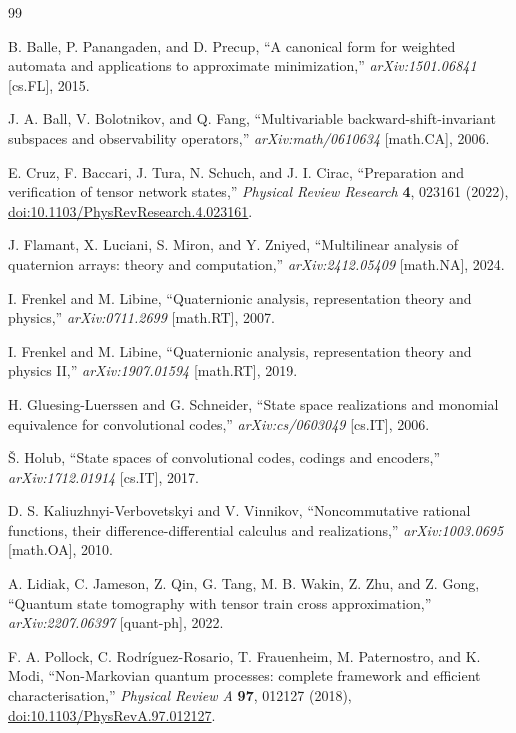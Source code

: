 \begin{thebibliography}{99}

B. Balle, P. Panangaden, and D. Precup,
``A canonical form for weighted automata and applications to approximate minimization,''
\emph{arXiv:1501.06841} [cs.FL], 2015.

J. A. Ball, V. Bolotnikov, and Q. Fang,
``Multivariable backward-shift-invariant subspaces and observability operators,''
\emph{arXiv:math/0610634} [math.CA], 2006.

E. Cruz, F. Baccari, J. Tura, N. Schuch, and J. I. Cirac,
``Preparation and verification of tensor network states,''
\emph{Physical Review Research} \textbf{4}, 023161 (2022),
\href{https://doi.org/10.1103/PhysRevResearch.4.023161}{doi:10.1103/PhysRevResearch.4.023161}.

J. Flamant, X. Luciani, S. Miron, and Y. Zniyed,
``Multilinear analysis of quaternion arrays: theory and computation,''
\emph{arXiv:2412.05409} [math.NA], 2024.

I. Frenkel and M. Libine,
``Quaternionic analysis, representation theory and physics,''
\emph{arXiv:0711.2699} [math.RT], 2007.

I. Frenkel and M. Libine,
``Quaternionic analysis, representation theory and physics II,''
\emph{arXiv:1907.01594} [math.RT], 2019.

H. Gluesing-Luerssen and G. Schneider,
``State space realizations and monomial equivalence for convolutional codes,''
\emph{arXiv:cs/0603049} [cs.IT], 2006.

\v{S}. Holub,
``State spaces of convolutional codes, codings and encoders,''
\emph{arXiv:1712.01914} [cs.IT], 2017.

D. S. Kaliuzhnyi-Verbovetskyi and V. Vinnikov,
``Noncommutative rational functions, their difference-differential calculus and realizations,''
\emph{arXiv:1003.0695} [math.OA], 2010.

A. Lidiak, C. Jameson, Z. Qin, G. Tang, M. B. Wakin, Z. Zhu, and Z. Gong,
``Quantum state tomography with tensor train cross approximation,''
\emph{arXiv:2207.06397} [quant-ph], 2022.

F. A. Pollock, C. Rodr\'iguez-Rosario, T. Frauenheim, M. Paternostro, and K. Modi,
``Non-Markovian quantum processes: complete framework and efficient characterisation,''
\emph{Physical Review A} \textbf{97}, 012127 (2018),
\href{https://doi.org/10.1103/PhysRevA.97.012127}{doi:10.1103/PhysRevA.97.012127}.


\end{thebibliography}
